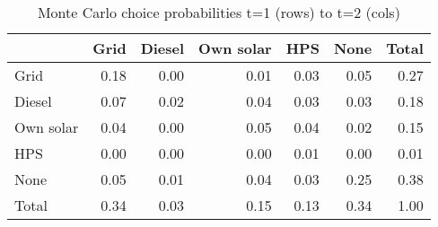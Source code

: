 \begin{table}[!ht]
	\centering
		\caption{Monte Carlo choice probabilities t=1 (rows) to t=2 (cols)}
\begin{tabular}{lrrrrrr}
		\toprule
               &      Grid&    Diesel& Own solar&       HPS&      None&     Total\\
		\midrule
		           Grid&      0.18&      0.00&      0.01&      0.03&      0.05&      0.27\\
		         Diesel&      0.07&      0.02&      0.04&      0.03&      0.03&      0.18\\
		      Own solar&      0.04&      0.00&      0.05&      0.04&      0.02&      0.15\\
		            HPS&      0.00&      0.00&      0.00&      0.01&      0.00&      0.01\\
		           None&      0.05&      0.01&      0.04&      0.03&      0.25&      0.38\\
		          Total&      0.34&      0.03&      0.15&      0.13&      0.34&      1.00\\
		\bottomrule
	\end{tabular}
\end{table}
